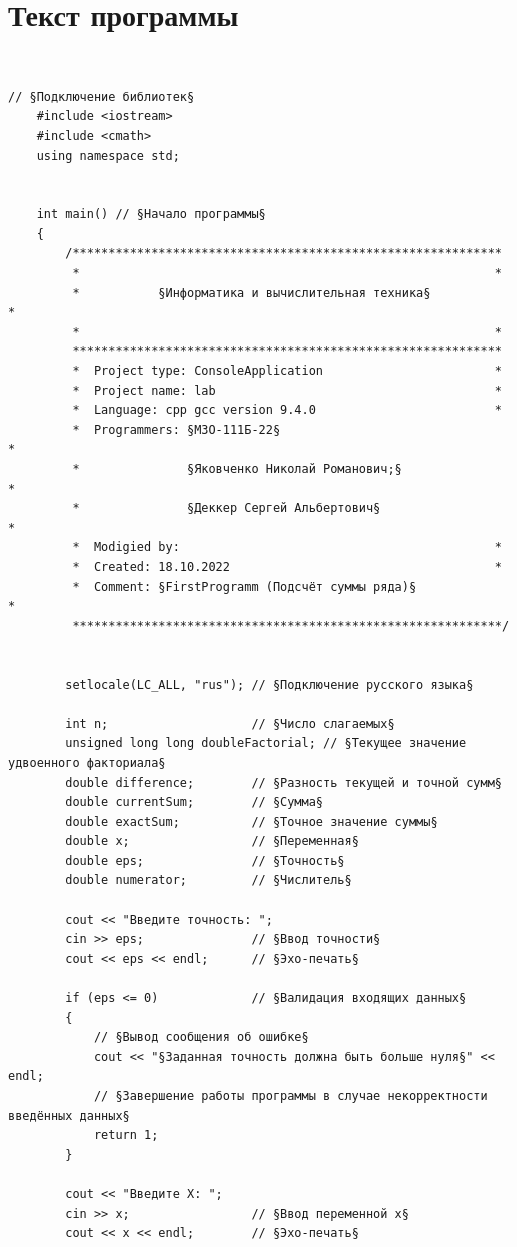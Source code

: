 \documentclass[a4paper]{article}
\begin{document}
	\newpage
	
	\section{Текст программы}
	
	\
	\begin{lstlisting}[style={CppCodeStyle}]
	// §Подключение библиотек§
	#include <iostream>
	#include <cmath>
	using namespace std;
	
	
	int main() // §Начало программы§
	{
		/************************************************************
		 *                                                          *
		 *           §Информатика и вычислительная техника§           *
		 *                                                          *
		 ************************************************************
		 *  Project type: ConsoleApplication                        *
		 *  Project name: lab                                       *
		 *  Language: cpp gcc version 9.4.0                         *
		 *  Programmers: §М3О-111Б-22§                                *
		 *               §Яковченко Николай Романович;§               *
		 *               §Деккер Сергей Альбертович§                  *
		 *  Modigied by:                                            *
		 *  Created: 18.10.2022                                     *
		 *  Comment: §FirstProgramm (Подсчёт суммы ряда)§             *
		 ************************************************************/
		
		
		setlocale(LC_ALL, "rus"); // §Подключение русского языка§
		
		int n;                    // §Число слагаемых§
		unsigned long long doubleFactorial; // §Текущее значение удвоенного факториала§
		double difference;        // §Разность текущей и точной сумм§
		double currentSum;        // §Сумма§
		double exactSum;          // §Точное значение суммы§
		double x;                 // §Переменная§
		double eps;               // §Точность§
		double numerator;         // §Числитель§
		
		cout << "Введите точность: ";
		cin >> eps;               // §Ввод точности§
		cout << eps << endl;      // §Эхо-печать§
		
		if (eps <= 0)             // §Валидация входящих данных§
		{
			// §Вывод сообщения об ошибке§
			cout << "§Заданная точность должна быть больше нуля§" << endl; 
			// §Завершение работы программы в случае некорректности введённых данных§
			return 1;
		}
		
		cout << "Введите X: ";
		cin >> x;                 // §Ввод переменной x§
		cout << x << endl;        // §Эхо-печать§
		

\end{lstlisting}
\end{document}
